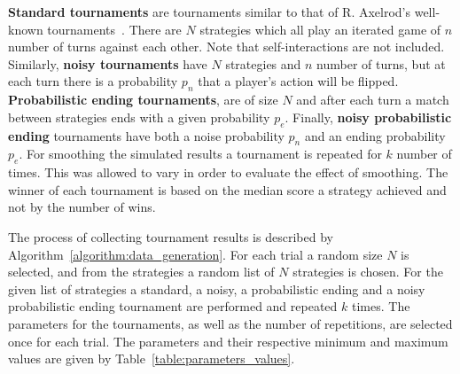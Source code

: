 \documentclass{article}
\newcommand{\numberofstrategies}{}
\begin{document}
\textbf{Standard tournaments} are tournaments similar to that of R. Axelrod's well-known
tournaments~\cite{Axelrod1980a}. There are \(N\) strategies which all play an iterated
game of \(n\) number of turns against each other. Note that self-interactions
are not included. Similarly, \textbf{noisy
tournaments} have \(N\) strategies and \(n\) number of turns, but at each turn
there is a probability \(p_n\) that a player's action will be flipped.
\textbf{Probabilistic ending tournaments}, are of size \(N\) and after each turn
a match between strategies ends with a given probability \(p_e\). Finally,
\textbf{noisy probabilistic ending} tournaments have both a noise probability
\(p_n\) and an ending probability \(p_e\). For smoothing the simulated results a
tournament is repeated for \(k\) number of times. This was allowed to vary
in order to evaluate the effect of smoothing. The winner of each tournament
is based on the median score a strategy achieved and not by the number of wins.

The process of collecting tournament results is described by
Algorithm~\ref{algorithm:data_generation}. For each trial a random size \(N\) is
selected, and from the \numberofstrategies strategies a random list of \(N\) strategies is
chosen. For the given list of strategies a standard, a noisy, a probabilistic
ending and a noisy probabilistic ending tournament are performed and repeated
\(k\) times. The parameters for the tournaments, as well as the number of
repetitions, are selected once for each trial. The parameters and their
respective minimum and maximum values are given by
Table~\ref{table:parameters_values}.

\begin{table}[!htbp]
    \begin{center}
    \end{center}
    \caption{Data collection; parameters' values}
    \label{table:parameters_values}
\end{table}
\end{document}
